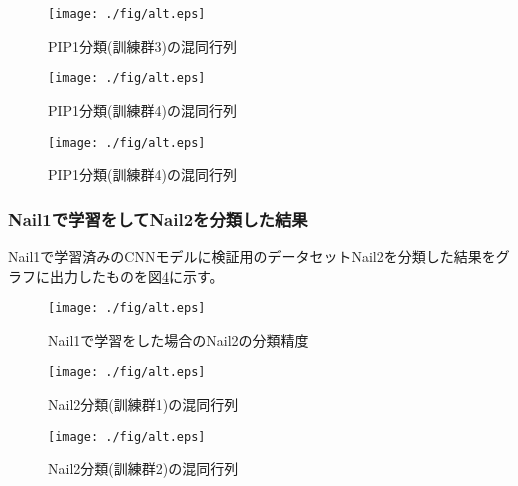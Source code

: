 		\begin{figure}[htbp]
			\begin{center}
			  \texttt{[image: ./fig/alt.eps]}
			  \caption{PIP1分類(訓練群3)の混同行列}
			  \label{fig:3_2}
			\end{center}
		\end{figure}

		\begin{figure}[htbp]
			\begin{center}			  
			  \texttt{[image: ./fig/alt.eps]}
			  \caption{PIP1分類(訓練群4)の混同行列}
			  \label{fig:3_2}
			\end{center}
		\end{figure}

		\begin{figure}[htbp]
			\begin{center}			  			  
			  \texttt{[image: ./fig/alt.eps]}
			  \caption{PIP1分類(訓練群4)の混同行列}
			  \label{fig:3_2}
			\end{center}
		\end{figure}
		

		\subsubsection{Nail1で学習をしてNail2を分類した結果}
		Nail1で学習済みのCNNモデルに検証用のデータセットNail2を分類した結果をグラフに出力したものを図\ref{fig:3_1}に示す。
		\begin{figure}[htbp]
			\begin{center}
			  \texttt{[image: ./fig/alt.eps]}
			  \caption{Nail1で学習をした場合のNail2の分類精度}
			  \label{fig:3_1}
			\end{center}
		\end{figure}

		\begin{figure}[htbp]
			\begin{center}
			  \texttt{[image: ./fig/alt.eps]}
			  \caption{Nail2分類(訓練群1)の混同行列}
			  \label{fig:3_2}
			\end{center}
		\end{figure}
		\begin{figure}[htbp]
			\begin{center}
			  \texttt{[image: ./fig/alt.eps]}
			  \caption{Nail2分類(訓練群2)の混同行列}
			  \label{fig:3_2}
			\end{center}
		\end{figure}

